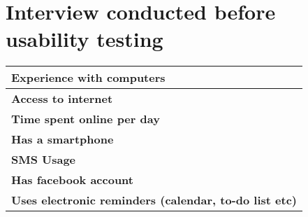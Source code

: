 \chapter{Interview conducted before usability testing}
\label{app:interviews-before-usability-testing}


\begin{center}
	\begin{tabular}{ | p{13.5cm} | }
		\hline
		\textbf{Experience with computers} \\[5ex] \hline
		\textbf{Access to internet} \\[5ex] \hline
		\textbf{Time spent online per day} \\[5ex] \hline
		\textbf{Has a smartphone} \\[5ex] \hline
		\textbf{SMS Usage} \\[5ex] \hline
		\textbf{Has facebook account} \\[5ex] \hline
		\textbf{Uses electronic reminders (calendar, to-do list etc)} \\ \hline
	\end{tabular}
\end{center}